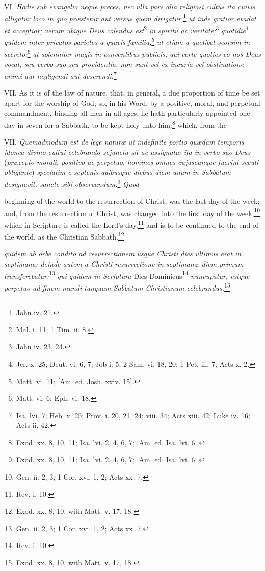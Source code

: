VI.\emph{ Hodie sub evangelio neque preces, nec ulla pars alia religiosi cultus ita cuivis alligatur loco in quo præstetur aut versus quem dirigatur,}\footnote{John iv. 21.}\emph{ ut inde gratior evadat et acceptior; verum ubique Deus colendus est}\footnote{Mal. i. 11; 1 Tim. ii. 8.}\emph{ in spiritu ac veritate;}\footnote{John iv. 23, 24.}\emph{ quotidie}\footnote{Jer. x. 25; Deut. vi. 6, 7; Job i. 5; 2 Sam. vi. 18, 20; 1 Pet. iii. 7; Acts x. 2.}\emph{ quidem inter privatos parietes a quavis familia,}\footnote{Matt. vi. 11; [Am. ed. Josh. xxiv. 15].}\emph{ ut etiam a quolibet seorsim in secreto;}\footnote{Matt. vi. 6; Eph. vi. 18.}\emph{ at solenniter magis in conventibus publicis, qui certe quoties eo nos Deus vocat, seu verbo suo seu providentia, non sunt vel ex incuria vel obstinatione animi aut negligendi aut deserendi.}\footnote{Isa. lvi. 7; Heb. x. 25; Prov. i. 20, 21, 24; viii. 34; Acts xiii. 42; Luke iv. 16; Acts ii. 42.}

VII. As it is of the law of nature, that, in general, a due proportion of time be set apart for the worship of God; so, in his Word, by a positive, moral, and perpetual commandment, binding all men in all ages, he hath particularly appointed one day in seven for a Sabbath, to be kept holy unto him:\footnote{Exod. xx. 8, 10, 11; Isa. lvi. 2, 4, 6, 7; [Am. ed. Isa. lvi. 6].} which, from the

VII. \emph{Quemadmodum est de lege naturæ ut indefinite portio quædam temporis idonea divino cultui celebrando sejuncta sit ac assignata; ita in verbo suo Deus }(\emph{præcepto morali, positivo ac perpetuo, homines omnes cujuscunque fuerint seculi obligante})\emph{ speciatim e septenis quibusque diebus diem unum in Sabbatum designavit, sancte sibi observandum.}\footnote{Exod. xx. 8, 10, 11; Isa. lvi. 2, 4, 6, 7; [Am. ed. Isa. lvi. 6].}\emph{ Quod }

beginning of the world to the resurrection of Christ, was the last day of the week; and, from the resurrection of Christ, was changed into the first day of the week,\footnote{Gen. ii. 2, 3; 1 Cor. xvi. 1, 2; Acts xx. 7.} which in Scripture is called the Lord's day,\footnote{Rev. i. 10.} and is to be continued to the end of the world, as the Christian Sabbath.\footnote{Exod. xx. 8, 10, with Matt. v. 17, 18.}

\emph{quidem ab orbe condito ad resurrectionem usque Christi dies ultimus erat in septimana; deinde autem a Christi resurrectione in septimanæ diem primum transferebatur;}\footnote{Gen. ii. 2, 3; 1 Cor. xvi. 1, 2; Acts xx. 7.}\emph{ qui quidem in Scriptura }Dies Dominicus\footnote{Rev. i. 10.}\emph{ nuncupatur, estque perpetuo ad finem mundi tanquam Sabbatum Christianum celebrandus.}\footnote{Exod. xx. 8, 10, with Matt. v. 17, 18.}

